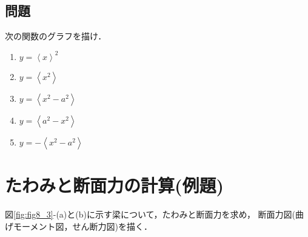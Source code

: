 \documentclass[10pt,a4j]{jarticle}
\begin{document}
\subsection{問題}
次の関数のグラフを描け．
\begin{enumerate}
\item $y=\left< x \right>^2$
\item $y=\left< x^2 \right>$
\item $y=\left< x^2-a^2 \right>$
\item $y=\left< a^2-x^2 \right>$
\item $y=-\left< x^2-a^2 \right>$
\end{enumerate}
\section{たわみと断面力の計算(例題)}
図\ref{fig:fig8_3}-(a)と(b)に示す梁について，たわみと断面力を求め，
断面力図(曲げモーメント図，せん断力図)を描く．
\renewcommand{\labelenumi}{(\alph{enumi})}
\end{document}
